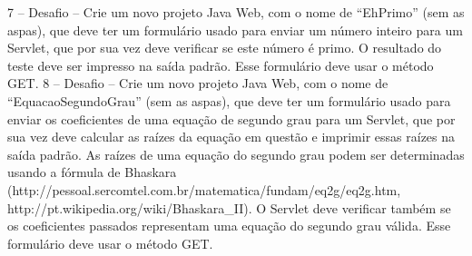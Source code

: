 7 – Desafio – Crie um novo projeto Java Web, com o nome de “EhPrimo” (sem as aspas), que deve ter um formulário usado para enviar um número inteiro para um Servlet, que por sua vez deve verificar se este número é primo. O resultado do teste deve ser impresso na saída padrão. Esse formulário deve usar o método GET.
8 – Desafio – Crie um novo projeto Java Web, com o nome de “EquacaoSegundoGrau” (sem as aspas), que deve ter um formulário usado para enviar os coeficientes de uma equação de segundo grau para um Servlet, que por sua vez deve calcular as raízes da equação em questão e imprimir essas raízes na saída padrão. As raízes de uma equação do segundo grau podem ser determinadas usando a fórmula de Bhaskara (http://pessoal.sercomtel.com.br/matematica/fundam/eq2g/eq2g.htm, http://pt.wikipedia.org/wiki/Bhaskara\_II). O Servlet deve verificar também se os coeficientes passados representam uma equação do segundo grau válida. Esse formulário deve usar o método GET.